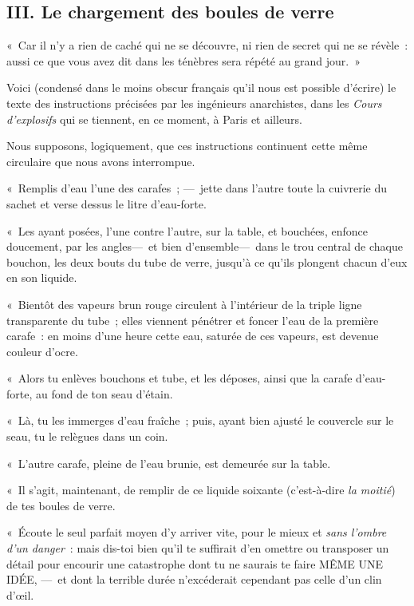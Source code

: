 \documentclass[french,twoside]{book} %
\newcommand{\bibl}[1]{{\RaggedLeft{#1}\par\bigskip}}
\begin{document}
 \subsection[{III. Le chargement des boules de verre}]{III. Le chargement des boules de verre}
\noindent « Car il n’y a rien de caché qui ne se découvre, ni rien de secret qui ne se révèle : aussi ce que vous avez dit dans les ténèbres sera répété au grand jour. »\par

\bibl{Évangile selon saint Luc, XII, 2 et 8.}
\noindent Voici (condensé dans le moins obscur français qu’il nous est possible d’écrire) le texte des instructions précisées par les ingénieurs anarchistes, dans les \emph{Cours d’explosifs} qui se tiennent, en ce moment, à Paris et ailleurs.\par
Nous supposons, logiquement, que ces instructions continuent cette même circulaire que nous avons interrompue.\par
« Remplis d’eau l’une des carafes ; — jette dans l’autre toute la cuivrerie du sachet et verse dessus le litre d’eau-forte.\par
« Les ayant posées, l’une contre l’autre, sur   la table, et bouchées, enfonce doucement, par les angles— et bien d’ensemble— dans le trou central de chaque bouchon, les deux bouts du tube de verre, jusqu’à ce qu’ils plongent chacun d’eux en son liquide.\par
« Bientôt des vapeurs brun rouge circulent à l’intérieur de la triple ligne transparente du tube ; elles viennent pénétrer et foncer l’eau de la première carafe : en moins d’une heure cette eau, saturée de ces vapeurs, est devenue couleur d’ocre.\par
« Alors tu enlèves bouchons et tube, et les déposes, ainsi que la carafe d’eau-forte, au fond de ton seau d’étain.\par
« Là, tu les immerges d’eau fraîche ; puis, ayant bien ajusté le couvercle sur le seau, tu le relègues dans un coin.\par
« L’autre carafe, pleine de l’eau brunie, est demeurée sur la table.\par
« Il s’agit, maintenant, de remplir de ce liquide soixante (c’est-à-dire \emph{la moitié}) de tes boules de verre.\par
« Écoute le seul parfait moyen d’y arriver   vite, pour le mieux et \emph{sans l’ombre d’un danger} : mais dis-toi bien qu’il te suffirait d’en omettre ou transposer un détail pour encourir une catastrophe dont tu ne saurais te faire MÊME UNE IDÉE, — et dont la terrible durée n’excéderait cependant pas celle d’un clin d’œil.\par
\end{document}

